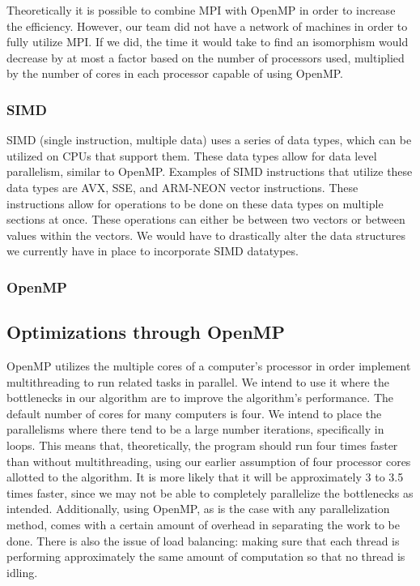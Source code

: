 \documentclass{article}
\begin{document}
    Theoretically it is possible to combine MPI with OpenMP in order to increase the efficiency. However, our team did not have a network of machines in order to fully utilize MPI. If we did, the time it would take to find an isomorphism would decrease by at most a factor based on the number of processors used, multiplied by the number of cores in each processor capable of using OpenMP.

    \subsubsection{SIMD}
    SIMD (single instruction, multiple data) uses a series of data types, which can be utilized on CPUs that support them. These data types allow for data level parallelism, similar to OpenMP. Examples of SIMD instructions that utilize these data types are AVX, SSE, and ARM-NEON vector instructions. These instructions allow for operations to be done on these data types on multiple sections at once. These operations can either be between two vectors or between values within the vectors. We would have to drastically alter the data structures we currently have in place to incorporate SIMD datatypes.

    \subsubsection{OpenMP}

  \subsection{Optimizations through OpenMP}
  OpenMP utilizes the multiple cores of a computer's processor in order implement multithreading to run related tasks in parallel. We intend to use it where the bottlenecks in our algorithm are to improve the algorithm's performance. The default number of cores for many computers is four. We intend to place the parallelisms where there tend to be a large number iterations, specifically in loops. This means that, theoretically, the program should run four times faster than without multithreading, using our earlier assumption of four processor cores allotted to the algorithm. It is more likely that it will be approximately 3 to 3.5 times faster, since we may not be able to completely parallelize the bottlenecks as intended. Additionally, using OpenMP, as is the case with any parallelization method, comes with a certain amount of overhead in separating the work to be done. There is also the issue of load balancing: making sure that each thread is performing approximately the same amount of computation so that no thread is idling.
\end{document}
